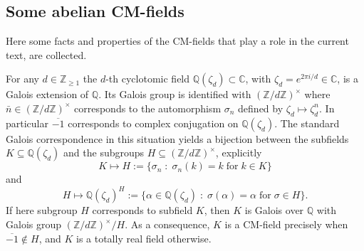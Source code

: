 \documentclass[a4paper,12pt]{amsart}
\newcommand{\ZZ}{{\mathbb Z}}
\newcommand{\CC}{{\mathbb C}}
\newcommand{\QQ}{{\mathbb Q}}
\numberwithin{equation}{section}
\theoremstyle{plain}
\numberwithin{thm}{section}
\begin{document}
 \subsection{Some abelian CM-fields}
Here some facts and properties of the
CM-fields that play a role in the current text, are collected.

For any $d\in\ZZ_{\geq 1}$ the $d$-th cyclotomic field $\QQ(\zeta_d)\subset\CC$, 
with $\zeta_d=e^{2\pi i/d}\in\CC$,
is a Galois extension of $\QQ$. Its
Galois group is identified with
$(\ZZ/d\ZZ)^\times$ where
$\bar{n}\in (\ZZ/d\ZZ)^\times$
corresponds to the automorphism $\sigma_n$ defined by $\zeta_d\mapsto \zeta_d^n$.
In particular $\overline{-1}$ corresponds
to complex conjugation on $\QQ(\zeta_d)$.
The standard Galois correspondence in this situation yields
a bijection between the subfields $K\subseteq \QQ(\zeta_d)$
and the subgroups $H\subseteq (\ZZ/d\ZZ)^\times$,
explicitly
\[K\mapsto H:=\{\sigma_n\;:\;\sigma_n(k)=k\;\textrm{for}\;k\in K\}\]
and 
\[H\mapsto \QQ(\zeta_d)^H:=\{\alpha\in\QQ(\zeta_d)\;:\;
\sigma(\alpha)=\alpha\;\textrm{for}\;\sigma\in H\}.\]
If here subgroup $H$ corresponds to subfield $K$, then
$K$ is Galois over $\QQ$ with Galois group $(\ZZ/d\ZZ)^\times/H$. As a consequence, $K$ is a CM-field precisely when 
$\overline{-1}\not\in H$, and $K$ is a totally real field otherwise.
\end{document}
